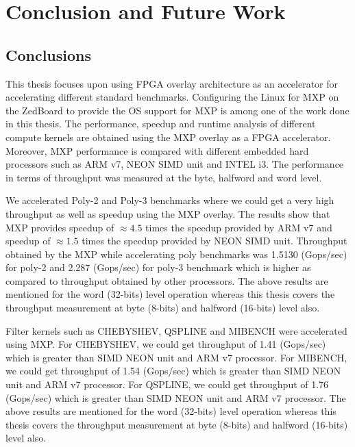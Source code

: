 \newpage
\chapter{Conclusion and Future Work}

\section{Conclusions}

This thesis focuses upon using FPGA overlay architecture as an accelerator for accelerating different standard benchmarks. Configuring the Linux for MXP on the ZedBoard to provide the OS support for MXP is among one of the work done in this thesis. The performance, speedup and runtime analysis of different compute kernels are obtained using the MXP overlay as a FPGA accelerator. Moreover, MXP performance is compared with different embedded hard processors such as ARM v7, NEON SIMD unit and INTEL i3. The performance in terms of throughput was measured at the byte, halfword and word level.

We accelerated Poly-2 and Poly-3 benchmarks where we could get a very high throughput as well as speedup using the MXP overlay. The results show that MXP provides speedup of ${\approx}4.5$ times the speedup provided by ARM v7 and speedup of ${\approx}1.5$ times the speedup provided by NEON SIMD unit. Throughput obtained by the MXP while accelerating poly benchmarks was 1.5130 (Gops/sec) for poly-2 and 2.287 (Gops/sec) for poly-3 benchmark which is higher as compared to throughput obtained by other processors. The above results are mentioned for the word (32-bits) level operation whereas this thesis covers the throughput measurement at byte (8-bits) and halfword (16-bits) level also.

Filter kernels such as CHEBYSHEV, QSPLINE and MIBENCH were accelerated using MXP. For CHEBYSHEV, we could get throughput of 1.41 (Gops/sec) which is greater than SIMD NEON unit and ARM v7 processor. For MIBENCH, we could get throughput of 1.54 (Gops/sec) which is greater than SIMD NEON unit and ARM v7 processor. For QSPLINE, we could get throughput of 1.76 (Gops/sec) which is greater than SIMD NEON unit and ARM v7 processor. The above results are mentioned for the word (32-bits) level operation whereas this thesis covers the throughput measurement at byte (8-bits) and halfword (16-bits) level also.



